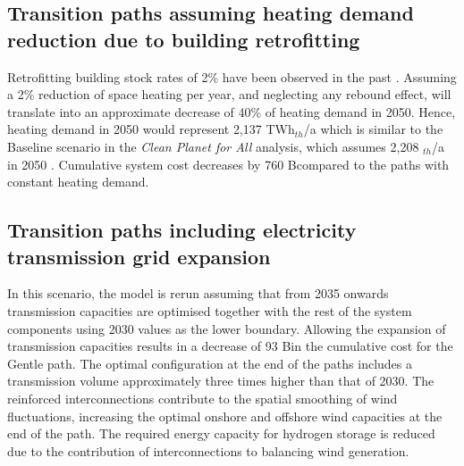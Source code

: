 \documentclass[3p]{elsarticle} %
\begin{document}

\subsection{Transition paths assuming heating demand reduction due to building retrofitting}

Retrofitting building stock rates of 2\% have been observed in the past \cite{agora}. Assuming a 2\% reduction of space heating per year, and neglecting any rebound effect, will translate into an approximate decrease of 40\% of heating demand in 2050. Hence, heating demand in 2050 would represent 2,137 TWh$_{th}$/a which is similar to the Baseline scenario in the \textsl{Clean Planet for All} analysis, which assumes 2,208 $_{th}$/a in 2050 \cite{in-depth_2018}. Cumulative system cost decreases by 760 B\EUR compared to the paths with constant heating demand.

\subsection{Transition paths including electricity transmission grid expansion}

In this scenario, the model is rerun assuming that from 2035 onwards transmission capacities are optimised together with the rest of the system components using 2030 values as the lower boundary. Allowing the expansion of transmission capacities results in a decrease of 93 B\EUR in the cumulative cost for the Gentle path. The optimal configuration at the end of the paths includes a transmission volume approximately three times higher than that of 2030. The reinforced interconnections contribute to the spatial smoothing of wind fluctuations, increasing the optimal onshore and offshore wind capacities at the end of the path. The required energy capacity for hydrogen storage is reduced due to the contribution of interconnections to balancing wind generation. 

\FloatBarrier
\end{document}
